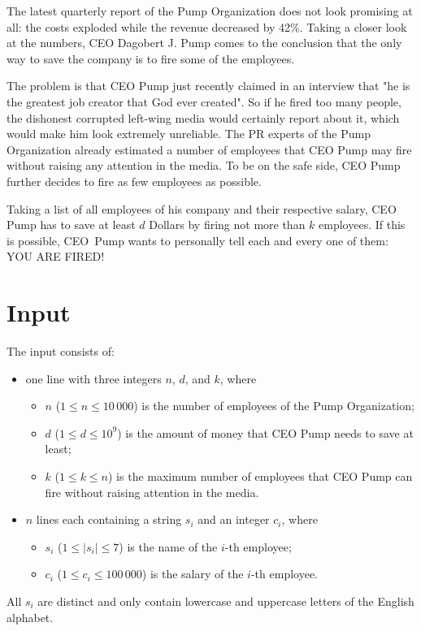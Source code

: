 
The latest quarterly report of the Pump Organization does not look promising at all: the costs exploded while the revenue decreased by 42\%. Taking a closer look at the numbers, CEO Dagobert J. Pump comes to the conclusion that the only way to save the company is to fire some of the employees.

The problem is that CEO Pump just recently claimed in an interview that "he is the greatest job creator that God ever created". So if he fired too many people, the dishonest corrupted left-wing media would certainly report about it, which would make him look extremely unreliable. The PR experts of the Pump Organization already estimated a number of employees that CEO Pump may fire without raising any attention in the media. To be on the safe side, CEO Pump further decides to fire as few employees as possible.

Taking a list of all employees of his company and their respective salary, CEO Pump has to save at least $d$ Dollars by firing not more than $k$ employees. If this is possible, CEO~Pump wants to personally tell each and every one of them: YOU ARE FIRED!


\section*{Input}
The input consists of:
\begin{itemize}
	\item one line with three integers $n$, $d$, and $k$, where 
	\begin{itemize}
		\item $n$ ($1 \le n \le 10\,000$) is the number of employees of the Pump Organization;
		\item $d$ ($1 \le d \le 10^{9}$) is the amount of money that CEO Pump needs to save at least;
		\item $k$ ($1 \le k \le n$) is the maximum number of employees that CEO Pump can fire without raising attention in the media.
	\end{itemize}
	\item $n$ lines each containing a string $s_i$ and an integer $c_i$, where
	\begin{itemize}
		\item $s_i$ ($1 \le \left|s_i\right| \le 7$) is the name of the $i$-th employee;
		\item $c_i$ ($1 \le c_i \le 100\,000$) is the salary of the $i$-th employee.
	\end{itemize}
\end{itemize}
All $s_i$ are distinct and only contain lowercase and uppercase letters of the English alphabet.


